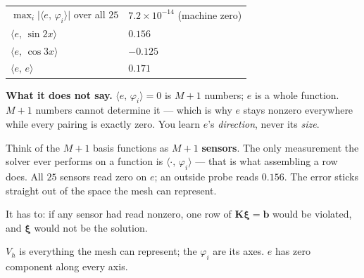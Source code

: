 \documentclass[11pt]{article}
\newcommand{\ip}[2]{\bigl\langle #1,\,#2\bigr\rangle}
\newcommand{\Vh}{V_{h}}
\newcommand{\Kmat}{\bm{K}}
\begin{document}
\begin{center}\small
\renewcommand{\arraystretch}{1.2}
\begin{tabular}{@{}ll@{}}
\toprule
$\max_i\bigl|\ip{e}{\varphi_i}\bigr|$ over all $25$ & $7.2\times10^{-14}$ \quad (machine zero)\\
$\ip{e}{\sin 2x}$ & $0.156$\\
$\ip{e}{\cos 3x}$ & $-0.125$\\
$\ip{e}{e}$       & $0.171$\\
\bottomrule
\end{tabular}
\end{center}

\begin{pts}
\item \textbf{What it does not say.} $\ip{e}{\varphi_i}=0$ is $M+1$ numbers;
      $e$ is a whole function. $M+1$ numbers cannot determine it --- which is
      why $e$ stays nonzero everywhere while every pairing is exactly zero.
      You learn $e$'s \emph{direction}, never its \emph{size}.
\end{pts}

\begin{intuition}
Think of the $M+1$ basis functions as $M+1$ \textbf{sensors}. The only
measurement the solver ever performs on a function is $\ip{\cdot}{\varphi_i}$ ---
that is what assembling a row does. All $25$ sensors read zero on $e$; an
outside probe reads $0.156$. The error sticks straight out of the space the mesh
can represent.

It has to: if any sensor had read nonzero, one row of $\Kmat\bm{\xi}=\bm{b}$
would be violated, and $\bm{\xi}$ would not be the solution.
\end{intuition}

\begin{center}
\par\smallskip
{\small $\Vh$ is everything the mesh can represent; the $\varphi_i$ are its
axes. $e$ has zero component along every axis.}
\end{center}
\end{document}

